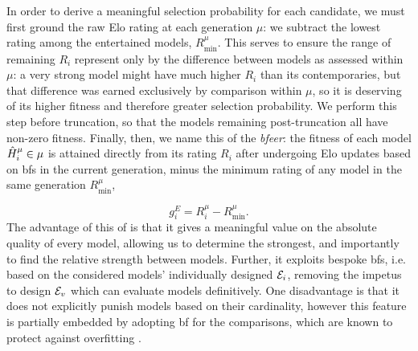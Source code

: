 \par 
In order to derive a meaningful selection probability for each candidate, 
    we must first ground the raw \gls{Elo rating} at each generation $\mu$:
    we subtract the lowest rating among the entertained models, $R_{\textrm{min}}^{\mu}$.
This serves to ensure the range of remaining $R_i$ represent only by the difference between
    models as assessed within $\mu$: 
    a very strong model might have much higher $R_i$ than its contemporaries, 
    but that difference was earned exclusively by comparison within $\mu$, 
    so it is deserving of its higher fitness and therefore greater selection probability. 
We perform this step before truncation\footnotemark, so that the models remaining post-truncation
    all have non-zero fitness. 
Finally, then, we name this \gls{of} the \emph{\gls{bfeer}}:
    the fitness of each model $\hat{H}_i^{\mu} \in \mu$ is attained directly from its rating $R_i$
    after undergoing Elo updates based on \glspl{bf} in the current generation, minus the minimum rating of any model 
    in the same generation $R^{\mu}_{\textrm{min}}$,

\begin{equation}
    \label{eqn:elo_fitness}
    g_i^E = R_i^{\mu} - R_{\textrm{min}}^{\mu}.
\end{equation}
The advantage of this \gls{of} is that it gives a meaningful value on the absolute quality of every model, 
    allowing us to determine the strongest, and importantly to find the relative strength between models. 
Further, it exploits bespoke \glspl{bf}, i.e. based on the considered models' 
    individually designed ${ \mathcal{E} }_i$,
    removing the impetus to design ${ \mathcal{E} }_v$ which can
    evaluate models definitively. 
One disadvantage is that it does not explicitly punish models based 
    on their cardinality, 
    however this feature is partially embedded by adopting \gls{bf} for the comparisons, 
    which are known to protect against overfitting \cite{kass1995bayes}.


